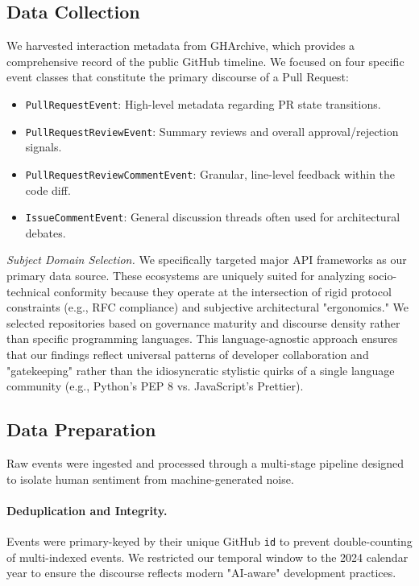 \documentclass[10pt]{article}
\begin{document}
\subsection{Data Collection}
We harvested interaction metadata from GHArchive, which provides a comprehensive record of the public GitHub timeline. We focused on four specific event classes that constitute the primary discourse of a Pull Request:
\begin{itemize}
\item \texttt{PullRequestEvent}: High-level metadata regarding PR state transitions.
\item \texttt{PullRequestReviewEvent}: Summary reviews and overall approval/rejection signals.
\item \texttt{PullRequestReviewCommentEvent}: Granular, line-level feedback within the code diff.
\item \texttt{IssueCommentEvent}: General discussion threads often used for architectural debates.
\end{itemize}

\textit{Subject Domain Selection.} We specifically targeted major API frameworks as our primary data source. These ecosystems are uniquely suited for analyzing socio-technical conformity because they operate at the intersection of rigid protocol constraints (e.g., RFC compliance) and subjective architectural "ergonomics." We selected repositories based on governance maturity and discourse density rather than specific programming languages. This language-agnostic approach ensures that our findings reflect universal patterns of developer collaboration and "gatekeeping" rather than the idiosyncratic stylistic quirks of a single language community (e.g., Python's PEP 8 vs. JavaScript's Prettier).

\subsection{Data Preparation}
Raw events were ingested and processed through a multi-stage pipeline designed to isolate human sentiment from machine-generated noise.

\paragraph{Deduplication and Integrity.} Events were primary-keyed by their unique GitHub \texttt{id} to prevent double-counting of multi-indexed events. We restricted our temporal window to the 2024 calendar year to ensure the discourse reflects modern "AI-aware" development practices.
\end{document}
